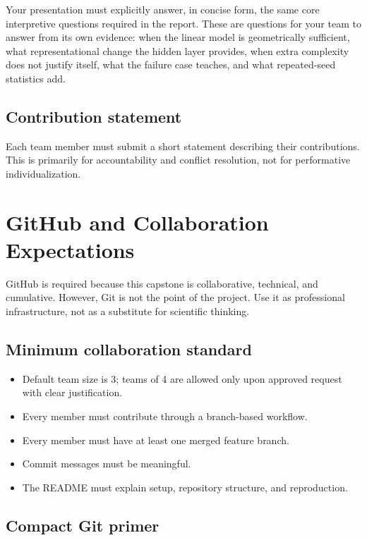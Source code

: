 \documentclass[11pt]{article}
\begin{document}
Your presentation must explicitly answer, in concise form, the same core interpretive questions required in the report. These are questions for your team to answer from its own evidence: when the linear model is geometrically sufficient, what representational change the hidden layer provides, when extra complexity does not justify itself, what the failure case teaches, and what repeated-seed statistics add.

\subsection{Contribution statement}

Each team member must submit a short statement describing their contributions. This is primarily for accountability and conflict resolution, not for performative individualization.

\section{GitHub and Collaboration Expectations}

GitHub is required because this capstone is collaborative, technical, and cumulative. However, Git is not the point of the project. Use it as professional infrastructure, not as a substitute for scientific thinking.

\subsection{Minimum collaboration standard}

\begin{itemize}
    \item Default team size is 3; teams of 4 are allowed only upon approved request with clear justification.
    \item Every member must contribute through a branch-based workflow.
    \item Every member must have at least one merged feature branch.
    \item Commit messages must be meaningful.
    \item The README must explain setup, repository structure, and reproduction.
\end{itemize}

\subsection{Compact Git primer}
\end{document}
